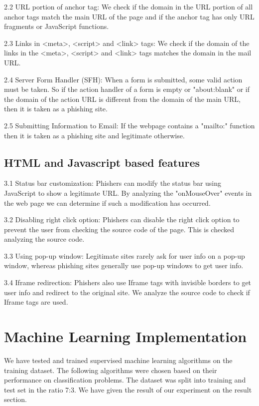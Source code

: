 \documentclass[conference]{IEEEtran}
\begin{document}
\par 2.2 URL portion of anchor tag: We check if the domain
in the URL portion of all anchor tags match the main URL
of the page and if the anchor tag has only URL fragments or
JavaScript functions.

\par 2.3 Links in <meta>, <script> and <link> tags: We check
if the domain of the links in the <meta>, <script> and <link>
tags matches the domain in the mail URL.

\par 2.4 Server Form Handler (SFH): When a form is submitted,
some valid action must be taken. So if the action handler of a
form is empty or "about:blank" or if the domain of the action
URL is different from the domain of the main URL, then it is
taken as a phishing site.

\par 2.5 Submitting Information to Email: If the webpage contains
a "mailto:" function then it is taken as a phishing site
and legitimate otherwise.

\subsection{HTML and Javascript based features}
\par 3.1 Status bar customization: Phishers can modify the
status bar using JavaScript to show a legitimate URL. By
analyzing the "onMouseOver" events in the web page we can
determine if such a modification has occurred.

\par 3.2 Disabling right click option: Phishers can disable the
right click option to prevent the user from checking the source
code of the page. This is checked analyzing the source code.

\par 3.3 Using pop-up window: Legitimate sites rarely ask for
user info on a pop-up window, whereas phishing sites generally
use pop-up windows to get user info.

\par 3.4 Iframe redirection: Phishers also use Iframe tags with
invisible borders to get user info and redirect to the original
site. We analyze the source code to check if Iframe tags are
used.
\section{Machine Learning Implementation}
We have tested and trained supervised machine learning
algorithms on the training dataset. The following algorithms
were chosen based on their performance on classification
problems. The dataset was split into training and test set in
the ratio 7:3. We have given the result of our experiment on the result section.
\end{document}
